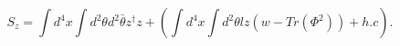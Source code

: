 \begin{equation}
S_{z}=\int d^4 x\int d^{2}\theta
d^{2}\bar{\theta}z^{\dagger }z+\left( \int d^4 x\int d^{2}\theta
lz\left( w-Tr(\Phi^2)\right) +h.c\right).  \label{dom}
\end{equation}

